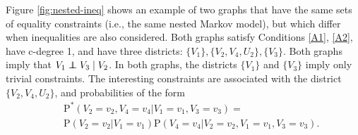 \documentclass[12pt]{article}
\newcommand\indep{\protect\mathpalette{\protect\independenT}{\perp}}
\def\independenT#1#2{\mathrel{\rlap{$#1#2$}\mkern2mu{#1#2}}}
\def\Pr{{\mathrm{P}}}
\def\Pdo{{\mathrm{P}^*}}
\begin{document}
Figure \ref{fig:nested-ineq} shows an example of two graphs that have the same sets of equality constraints (i.e., the same nested Markov model), but which differ when inequalities are also considered. Both graphs satisfy Conditions \ref{A1}, \ref{A2}, have c-degree 1, and have three districts: $\{V_1\}, \{V_2, V_4, U_2\}, \{V_3\}$. Both graphs imply that $V_1 \indep V_3 \mid V_2$. In both graphs, the districts $\{V_1\}$ and $\{V_3\}$ imply only trivial constraints. The interesting constraints are associated with the district $\{V_2, V_4, U_2\}$, and probabilities of the form
\begin{eqnarray*}
&& \Pdo(V_2 = v_2, V_4 = v_4 | V_1 = v_1, V_3 = v_3) = \\ 
&& \Pr(V_2 = v_2 | V_1 = v_1) \Pr(V_4 = v_4 | V_2 = v_2, V_1 = v_1, V_3 = v_3).   
\end{eqnarray*}

\end{document}

